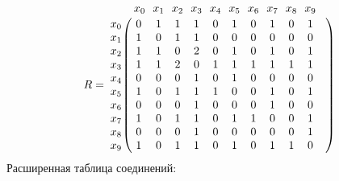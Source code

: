 \documentclass{article}
\begin{document}
\begin{figure}[h!]
\end{figure}
$$
R =
\bordermatrix{ & x_{0} \!&\! x_{1} \!&\! x_{2} \!&\! x_{3} \!&\! x_{4} \!&\! x_{5} \!&\! x_{6} \!&\! x_{7} \!&\! x_{8} \!&\! x_{9} \!&\! \cr 
x_{0} \!&\! 0 \!&\! 1 \!&\! 1 \!&\! 1 \!&\! 0 \!&\! 1 \!&\! 0 \!&\! 1 \!&\! 0 \!&\! 1 \!&\! \cr
x_{1} \!&\! 1 \!&\! 0 \!&\! 1 \!&\! 1 \!&\! 0 \!&\! 0 \!&\! 0 \!&\! 0 \!&\! 0 \!&\! 0 \!&\! \cr
x_{2} \!&\! 1 \!&\! 1 \!&\! 0 \!&\! 2 \!&\! 0 \!&\! 1 \!&\! 0 \!&\! 1 \!&\! 0 \!&\! 1 \!&\! \cr
x_{3} \!&\! 1 \!&\! 1 \!&\! 2 \!&\! 0 \!&\! 1 \!&\! 1 \!&\! 1 \!&\! 1 \!&\! 1 \!&\! 1 \!&\! \cr
x_{4} \!&\! 0 \!&\! 0 \!&\! 0 \!&\! 1 \!&\! 0 \!&\! 1 \!&\! 0 \!&\! 0 \!&\! 0 \!&\! 0 \!&\! \cr
x_{5} \!&\! 1 \!&\! 0 \!&\! 1 \!&\! 1 \!&\! 1 \!&\! 0 \!&\! 0 \!&\! 1 \!&\! 0 \!&\! 1 \!&\! \cr
x_{6} \!&\! 0 \!&\! 0 \!&\! 0 \!&\! 1 \!&\! 0 \!&\! 0 \!&\! 0 \!&\! 1 \!&\! 0 \!&\! 0 \!&\! \cr
x_{7} \!&\! 1 \!&\! 0 \!&\! 1 \!&\! 1 \!&\! 0 \!&\! 1 \!&\! 1 \!&\! 0 \!&\! 0 \!&\! 1 \!&\! \cr
x_{8} \!&\! 0 \!&\! 0 \!&\! 0 \!&\! 1 \!&\! 0 \!&\! 0 \!&\! 0 \!&\! 0 \!&\! 0 \!&\! 1 \!&\! \cr
x_{9} \!&\! 1 \!&\! 0 \!&\! 1 \!&\! 1 \!&\! 0 \!&\! 1 \!&\! 0 \!&\! 1 \!&\! 1 \!&\! 0 \!&\! \cr
}$$
Расширенная таблица соединений:
\end{document}
